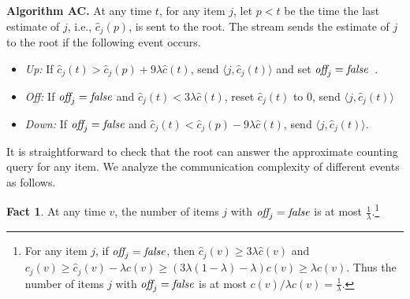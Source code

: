 \documentclass[proceedings]{stacs}
\theoremstyle{definition}\newtheorem{fact}{Fact}
\newcommand{\ns}{c}
\newcommand{\hns}{\hat c}
\newcommand{\cjs}{c_{j}}
\newcommand{\hcjs}{\hat c_{j}}
\newcommand{\off}{\mbox{\it off}_{j}}
\newcommand{\true}{\mbox{\it true}}
\newcommand{\false}{\mbox{\it false}}
\begin{document}
\vspace{.5ex}
\begin{center}
\begin{minipage}{.9\textwidth}
\hrulefill

{\bf Algorithm AC.}
At any time $t$, for any item $j$,  {let
  {$p < t$} be the time the
last estimate of $j$, i.e., $\hcjs(p)$, is
sent to the root.}
The stream sends the estimate of $j$ to the root
if the following event occurs.
 \begin{itemize}
 \item
 {\it Up:} \hspace{3ex}If $\hcjs(t) >  {\hcjs(p)} + 9\lambda \hns(t)$,
 send $\langle j, \hcjs(t) \rangle$ and set $\off = \false$~.
 \item
 {\it Off:} \hspace{2.7ex}If
  $\off = \false$ and $\hcjs(t) < 3 \lambda \hns(t)$,
{reset $\hcjs(t)$ to 0,
  send $\langle j, \hcjs(t)\rangle$}\\
  \mbox{}\hspace{.5in}{and set $\off=\true$.}
 \item
 {\it Down:} If $\off = \false$ and $\hcjs(t) <
  {\hcjs(p)} - 9\lambda \hns(t)$,
 send $\langle j,  \hcjs(t) \rangle$.
 \end{itemize}
\vspace*{-.1in}
\hrulefill
 \end{minipage}
\end{center}
\vspace*{.05in}
\vspace{.5ex}










It is straightforward to check that the root can
answer the approximate counting query for any item.
We analyze the communication complexity of different events as follows.

\begin{fact} \label{lem:rj}
At any time $v$, the number of items $j$ with $\off = \false$ is at most
$\frac{1}{\lambda}$.\footnote{For any item $j$, if $\off = \false$,
  then $\hcjs(v) \ge 3 \lambda \hns(v)$ and
  $\cjs(v) \ge \hcjs(v) - \lambda \ns(v)
  \ge (3 \lambda (1  - \lambda) - \lambda) \ns(v)
  \ge \lambda \ns(v)$.  Thus
  the number of items $j$ with $\off = \false$ is at most
  $\ns(v) / \lambda \ns(v) = \frac{1}{\lambda}$.
} \end{fact}
\end{document}
